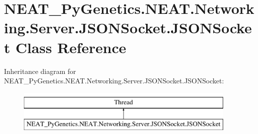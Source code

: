 \hypertarget{class_n_e_a_t___py_genetics_1_1_n_e_a_t_1_1_networking_1_1_server_1_1_j_s_o_n_socket_1_1_j_s_o_n_socket}{}\section{N\+E\+A\+T\+\_\+\+Py\+Genetics.\+N\+E\+A\+T.\+Networking.\+Server.\+J\+S\+O\+N\+Socket.\+J\+S\+O\+N\+Socket Class Reference}
\label{class_n_e_a_t___py_genetics_1_1_n_e_a_t_1_1_networking_1_1_server_1_1_j_s_o_n_socket_1_1_j_s_o_n_socket}
Inheritance diagram for N\+E\+A\+T\+\_\+\+Py\+Genetics.\+N\+E\+A\+T.\+Networking.\+Server.\+J\+S\+O\+N\+Socket.\+J\+S\+O\+N\+Socket\+:\begin{figure}[H]
\begin{center}
\leavevmode
\includegraphics[height=2.000000cm]{class_n_e_a_t___py_genetics_1_1_n_e_a_t_1_1_networking_1_1_server_1_1_j_s_o_n_socket_1_1_j_s_o_n_socket}
\end{center}
\end{figure}
